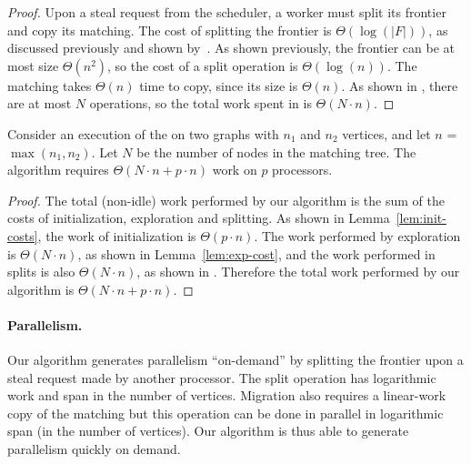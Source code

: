 \begin{proof}

Upon a steal request from the scheduler, a worker must
split its frontier and copy its matching.
%
The cost of splitting the frontier is $\Theta(\log(|F|))$, as
discussed previously and shown by~\cite{chunkedtreesequences}.
%
As shown previously, the frontier can be at most size $\Theta(n^2)$,
so the cost of a split operation is $\Theta(\log(n))$.
%
The matching takes $\Theta(n)$ time to copy, since its size is
$\Theta(n)$.
%
As shown in , there are at most $N$  operations,
so the total work spent in  is $\Theta(N \cdot n)$.

\end{proof}

\begin{theorem}\label{thm:multi-work}
Consider an execution of the \ouralgorithm{} on two graphs with $n_1$
and $n_2$ vertices, and let $n$ = $\max(n_1, n_2)$.
%
Let $N$ be the number of nodes in the matching tree.
%
The algorithm requires $\Theta(N \cdot n + p \cdot n)$ work 
on $p$ processors.

\end{theorem}

\begin{proof}

  The total (non-idle) work performed by our algorithm is the sum of the costs
  of initialization, exploration and splitting.
  As shown in Lemma~\ref{lem:init-costs}, the work of initialization is $\Theta(p\cdot n)$.
  The work performed by exploration is $\Theta(N \cdot n)$, as shown in Lemma~\ref{lem:exp-cost},
  and the work performed in splits is also $\Theta(N\cdot n)$, as shown in .
  Therefore the total work performed by our algorithm is $\Theta(N \cdot n + p \cdot n)$.
\end{proof}


\paragraph{Parallelism.}

Our algorithm generates parallelism ``on-demand'' by splitting the
frontier upon a steal request made by another processor.
%
The split operation has logarithmic work and span in the number of vertices.
%
Migration also requires a linear-work copy of the matching but this
operation can be done in parallel in logarithmic span (in the number of vertices).
%
Our algorithm is thus able to generate parallelism quickly on demand.
%

